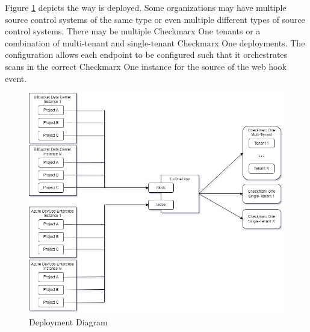 Figure \ref{fig:cxoneflow-deployment} depicts the way \cxoneflow is deployed.  Some organizations may have
multiple source control systems of the same type or even multiple different types of source control systems.
There may be multiple Checkmarx One tenants or a combination of multi-tenant and single-tenant Checkmarx One
deployments.  The \cxoneflow configuration allows each endpoint to be configured such that it orchestrates
scans in the correct Checkmarx One instance for the source of the web hook event.

\begin{figure}[h]
    \includegraphics[width=\textwidth]{graphics/cxoneflow-deployment.png}
    \caption{\cxoneflow Deployment Diagram}
    \label{fig:cxoneflow-deployment}
\end{figure}

